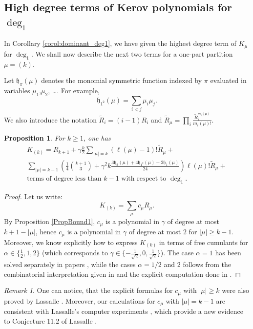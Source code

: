 \documentclass[11pt]{amsart}
\theoremstyle{plain}
\newtheorem{proposition}[lemma]{Proposition}
\theoremstyle{remark}
\newtheorem*{remark}{Remark}
\newcommand{\m}{\mathfrak{h}}
\begin{document}
\subsection{High degree terms of Kerov polynomials for $\deg_1$}
\label{SectRandomYD}

In Corollary \ref{corol:dominant_deg1},
we have given the highest degree term of $K_\mu$ for $\deg_1$.
We shall now describe the next two terms for a one-part partition $\mu=(k)$.

Let $\m_\pi(\mu)$ denotes the monomial symmetric function indexed by $\pi$
evaluated in variables $\mu_1$,$\mu_2$, \dots. For example,
\[\m_{1^2}(\mu)= \sum_{i<j}\mu_i \mu_j.\]
We also introduce the notation
$\tilde{R}_i =
(i-1)R_i$ and $\tilde{R}_{\mu} =
\prod_i\frac{\tilde{R}_i^{m_i(\mu)}}{m_i(\mu)!}$.

\begin{proposition}
\label{prop:TopDegrees}
    For $k \geq 1$, one has
\begin{multline}
K_{(k)} = R_{k+1} + \gamma \frac{k}{2}\sum_{|\mu| = k}(\ell(\mu)-1)!\tilde{R}_\mu +
\\
\sum_{|\mu| = k-1} \left(\frac{1}{4}\binom{k+1}{3} + \gamma^2 k
\frac{3\m_2(\mu) +
4\m_{1^2}(\mu) + 2\m_1(\mu)}{24}\right)\ell(\mu)!\tilde{R}_\mu + \\
\text{terms of
degree less than $k-1$ with respect to $\deg_1$.}
\end{multline}
\end{proposition}

\begin{proof}
Let us write:
$$ K_{(k)} = \sum_{\mu}c_\mu R_\mu.$$
By Proposition \ref{PropBound1}, $c_\mu$ is a polynomial in
$\gamma$ of degree at most $k+1-|\mu|$, hence $c_\mu$ is a polynomial in $\gamma$ of degree at
most $2$ for $|\mu| \geq k-1$.
Moreover, we know explicitly how to express $K_{(k)}$ in terms
of free cumulants for $\alpha \in \{ \frac{1}{2}, 1, 2\}$ (which corresponds to $\gamma \in \{
-\frac{1}{\sqrt{2}}, 0, \frac{1}{\sqrt{2}}\}$).
The case $\alpha=1$ has been solved separately in papers
\cite{GouldenRattan2007,SniadyGenusExpansion},
while the cases $\alpha=1/2$ and $2$ follows from the combinatorial
interpretation given in \cite{NousZonal} and the explicit computation
done in \cite{AgnieskaZonalGenus1}.
\end{proof}

\begin{remark}
One can notice, that the explicit formulas for $c_\mu$ with $|\mu| \geq k$ were
also proved by Lassalle \cite[Theorems 10.2 and 10.3]{Lassalle2009}.
Moreover, our calculations
for $c_\mu$ with $|\mu| = k-1$ are consistent with Lassalle's computer
experiments \cite[p. 2257]{Lassalle2009}, which provide a new evidence to
Conjecture 11.2 of Lassalle \cite{Lassalle2009}.
\end{remark}
\end{document}

